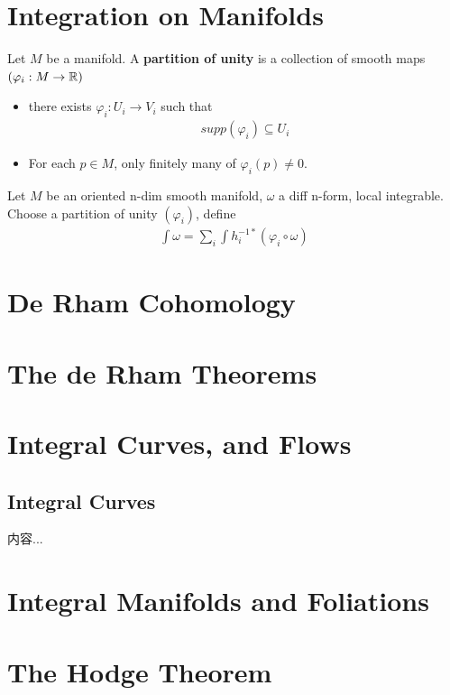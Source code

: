 \documentclass[Total.tex]{subfiles}
\begin{document}
	\chapter{Integration on Manifolds}
		\begin{Def}
			Let $M$ be a manifold. A \textbf{partition of unity} is a collection of smooth maps $(\varphi_i:M\rightarrow \mathbb{R})$ 
			\begin{itemize}
				\item there exists $\varphi_i:U_i\rightarrow V_i$ such that
				\begin{gather*}
					supp(\varphi_i)\subseteq U_i
				\end{gather*}
				
				\item For each $p\in M$, only finitely many of $\varphi_i(p)\not=0$.
			\end{itemize}
		\end{Def}
		\begin{Def}
			Let $M$ be an oriented n-dim smooth manifold, $\omega$ a diff n-form, local integrable. Choose a partition of unity $(\varphi_i)$, define
			\begin{gather*}
				\int \omega=\sum_i \int h_i^{-1*}(\varphi_i\circ\omega) 
			\end{gather*}
		\end{Def}
	\chapter{De Rham Cohomology}
	\chapter{The de Rham Theorems}
	\chapter{Integral Curves, and Flows}
		\section{Integral Curves}
			\begin{Def}
				内容...
			\end{Def}
	\chapter{Integral Manifolds and Foliations}
	\chapter{The Hodge Theorem}
		
\end{document}
